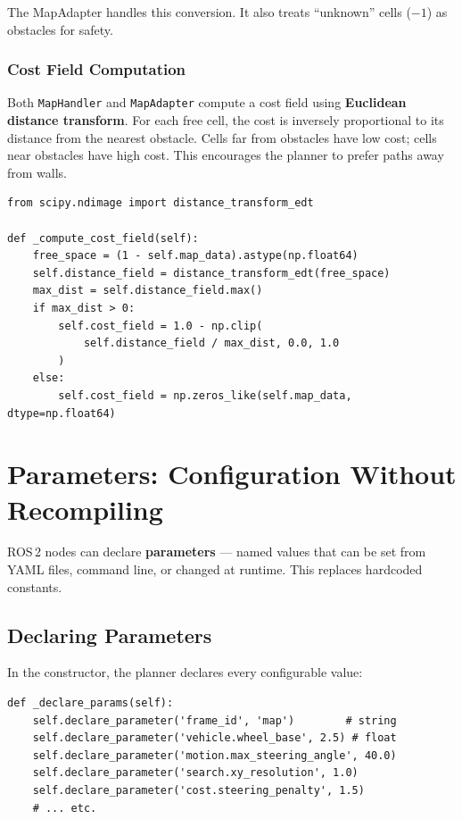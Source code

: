 \documentclass[12pt, a4paper]{article}
\begin{document}
The MapAdapter handles this conversion. It also treats ``unknown'' cells
($-1$) as obstacles for safety.

\subsubsection{Cost Field Computation}

Both \texttt{MapHandler} and \texttt{MapAdapter} compute a cost field
using \textbf{Euclidean distance transform}. For each free cell, the cost
is inversely proportional to its distance from the nearest obstacle.
Cells far from obstacles have low cost; cells near obstacles have high
cost. This encourages the planner to prefer paths away from walls.

\begin{lstlisting}[style=python, caption={Cost field computation (map\_adapter.py)}]
from scipy.ndimage import distance_transform_edt

def _compute_cost_field(self):
    free_space = (1 - self.map_data).astype(np.float64)
    self.distance_field = distance_transform_edt(free_space)
    max_dist = self.distance_field.max()
    if max_dist > 0:
        self.cost_field = 1.0 - np.clip(
            self.distance_field / max_dist, 0.0, 1.0
        )
    else:
        self.cost_field = np.zeros_like(self.map_data, dtype=np.float64)
\end{lstlisting}

\section{Parameters: Configuration Without Recompiling}
\label{sec:params}

ROS\,2 nodes can declare \textbf{parameters} --- named values that can be
set from YAML files, command line, or changed at runtime. This replaces
hardcoded constants.

\subsection{Declaring Parameters}

In the constructor, the planner declares every configurable value:

\begin{lstlisting}[style=python, caption={Parameter declaration (planner\_node.py)}]
def _declare_params(self):
    self.declare_parameter('frame_id', 'map')        # string
    self.declare_parameter('vehicle.wheel_base', 2.5) # float
    self.declare_parameter('motion.max_steering_angle', 40.0)
    self.declare_parameter('search.xy_resolution', 1.0)
    self.declare_parameter('cost.steering_penalty', 1.5)
    # ... etc.
\end{lstlisting}
\end{document}
